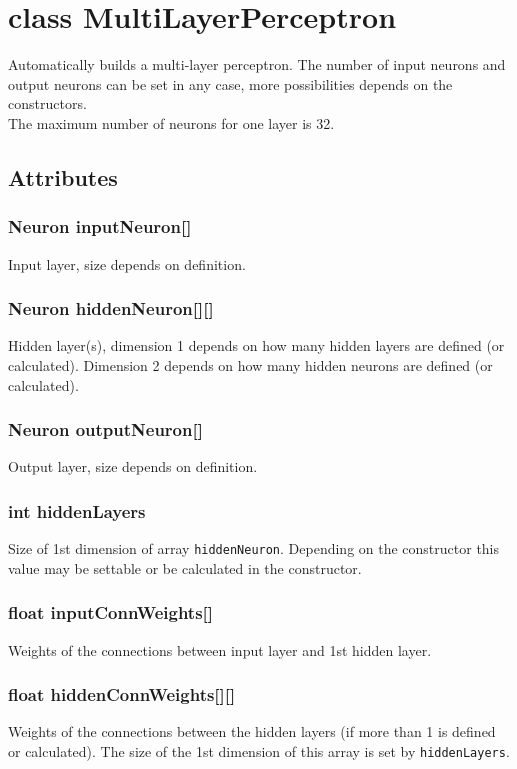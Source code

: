 \chapter{class MultiLayerPerceptron}
Automatically builds a multi-layer perceptron. The number of input neurons and output neurons can be set in any case, more possibilities depends on the constructors.\\
The maximum number of neurons for one layer is 32.

\section{Attributes}
\subsection{Neuron inputNeuron[]}
Input layer, size depends on definition.

\subsection{Neuron hiddenNeuron[][]}
Hidden layer(s), dimension 1 depends on how many hidden layers are defined (or calculated). Dimension 2 depends on how many hidden neurons are defined (or calculated).

\subsection{Neuron outputNeuron[]}
Output layer, size depends on definition.

\subsection{int hiddenLayers}
Size of 1st dimension of array \texttt{hiddenNeuron}. Depending on the constructor this value may be settable or be calculated in the constructor.

\subsection{float inputConnWeights[]}
Weights of the connections between input layer and 1st hidden layer.

\subsection{float hiddenConnWeights[][]}
Weights of the connections between the hidden layers (if more than 1 is defined or calculated). The size of the 1st dimension of this array is set by \texttt{hiddenLayers}.

